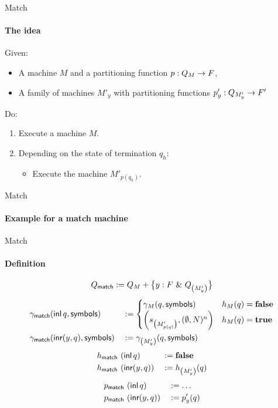 \begin{frame}{Match}
  \framesubtitle{The idea}
  Given:
  \begin{itemize}
    \item A machine $M$ and a partitioning function $p : Q_M \rightarrow F$,
    \item A family of machines $M'_y$ with partitioning functions $p'_y : Q_{M'_y} \rightarrow F'$
  \end{itemize}
  Do:
  \begin{enumerate}
    \item Execute a machine $M$.
    \item Depending on the state of termination $q_h$:
      \begin{itemize}
        \item Execute the machine $M'_{p(q_h)}$.
      \end{itemize}
  \end{enumerate}
\end{frame}


\begin{frame}{Match}
  \framesubtitle{Example for a match machine}
  
\end{frame}

\begin{frame}{Match}
  \framesubtitle{Definition}
  \footnotesize
  $$Q_{\textsf{match}} := Q_M + \bigl\{ y:F~{\&}~Q_{ \left( M'_{y} \right) } \bigr \}$$
  \begin{alignat*}{2}
    \gamma_{\textsf{match}} & (\operatorname{\textsf{inl}} q, \textsf{symbols}) &&:=
    \begin{cases}
      \gamma_{M}(q, \textsf{symbols})                                & h_M(q) = \mathbf{false} \\
      \left( s_{\left(M'_{p(q)}\right)}, (\emptyset, N)^n \right)  & h_M(q) = \mathbf{true}
    \end{cases} \\
    \gamma_{\textsf{match}} & (\operatorname{\textsf{inr}} (y, q), \textsf{symbols}) &&:= \gamma_{\left({M'_y}\right)}(q, \textsf{symbols})
  \end{alignat*}
  \begin{alignat*}{3}
    h_{\textsf{match}} &~ (\operatorname{\textsf{inl}}      q) &&:= \mathbf{false} \\
    h_{\textsf{match}} &~ (\operatorname{\textsf{inr}} (y, q)) &&:= h_{\left( M'_y \right)}(q)
  \end{alignat*}
  \begin{alignat*}{3}
    p_{\textsf{match}} &~ (\operatorname{\textsf{inl}}      q) &&:= \dots \\
    p_{\textsf{match}} &~ (\operatorname{\textsf{inr}} (y, q)) &&:= p'_y(q)
  \end{alignat*}
\end{frame}

